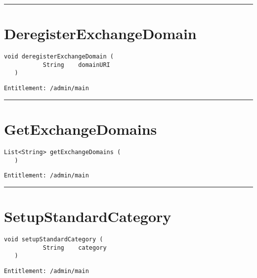 \rule{12cm}{2pt}
\section{DeregisterExchangeDomain}
\label{Api:DeregisterExchangeDomain}
\begin{lstlisting}[style=nonumbers]
   void deregisterExchangeDomain (
           String    domainURI
   )
\end{lstlisting}
\begin{Verbatim}[formatcom=\color{Maroon}]
  Entitlement: /admin/main
\end{Verbatim}



\rule{12cm}{2pt}
\section{GetExchangeDomains}
\label{Api:GetExchangeDomains}
\begin{lstlisting}[style=nonumbers]
   List<String> getExchangeDomains (
   )
\end{lstlisting}
\begin{Verbatim}[formatcom=\color{Maroon}]
  Entitlement: /admin/main
\end{Verbatim}



\rule{12cm}{2pt}
\section{SetupStandardCategory}
\label{Api:SetupStandardCategory}
\begin{lstlisting}[style=nonumbers]
   void setupStandardCategory (
           String    category
   )
\end{lstlisting}
\begin{Verbatim}[formatcom=\color{Maroon}]
  Entitlement: /admin/main
\end{Verbatim}



